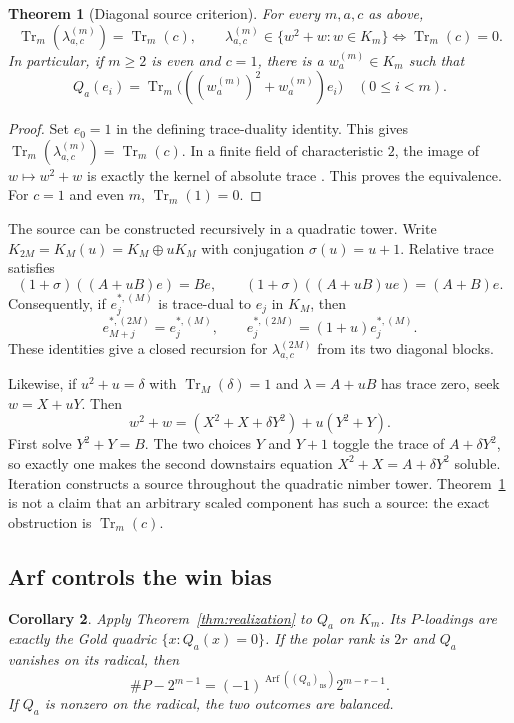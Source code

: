 \documentclass[11pt]{article}
\newtheorem{theorem}{Theorem}[section]
\newtheorem{corollary}[theorem]{Corollary}
\theoremstyle{definition}
\theoremstyle{remark}
\newcommand{\Tr}{\operatorname{Tr}}
\newcommand{\Arf}{\operatorname{Arf}}
\begin{document}
\begin{theorem}[Diagonal source criterion]\label{thm:diagonal}
For every $m,a,c$ as above,
\[
 \Tr_m(\lambda_{a,c}^{(m)})=\Tr_m(c),
 \qquad
 \lambda_{a,c}^{(m)}\in\{w^2+w:w\in K_m\}
 \Longleftrightarrow \Tr_m(c)=0.
\]
In particular, if $m\ge2$ is even and $c=1$, there is a
$w_a^{(m)}\in K_m$ such that
\[
 Q_a(e_i)=
 \Tr_m\bigl(((w_a^{(m)})^2+w_a^{(m)})e_i\bigr)
 \quad(0\le i<m).
\]
\end{theorem}

\begin{proof}
Set $e_0=1$ in the defining trace-duality identity.  This gives
$\Tr_m(\lambda_{a,c}^{(m)})=\Tr_m(c)$.  In a finite field of characteristic
$2$, the image of $w\mapsto w^2+w$ is exactly the kernel of absolute trace
\cite[Theorem 2.25]{lidlniederreiter1997}.  This proves the equivalence.
For $c=1$ and even $m$, $\Tr_m(1)=0$.
\end{proof}

The source can be constructed recursively in a quadratic tower.  Write
$K_{2M}=K_M(u)=K_M\oplus uK_M$ with conjugation $\sigma(u)=u+1$.  Relative
trace satisfies
\[
 (1+\sigma)((A+uB)e)=Be,\qquad
 (1+\sigma)((A+uB)ue)=(A+B)e.
\]
Consequently, if $e_j^{*,(M)}$ is trace-dual to $e_j$ in $K_M$, then
\[
 e_{M+j}^{*,(2M)}=e_j^{*,(M)},\qquad
 e_j^{*,(2M)}=(1+u)e_j^{*,(M)}.
\]
These identities give a closed recursion for $\lambda_{a,c}^{(2M)}$ from its
two diagonal blocks.

Likewise, if $u^2+u=\delta$ with $\Tr_M(\delta)=1$ and
$\lambda=A+uB$ has trace zero, seek $w=X+uY$.  Then
\[
 w^2+w=(X^2+X+\delta Y^2)+u(Y^2+Y).
\]
First solve $Y^2+Y=B$.  The two choices $Y$ and $Y+1$ toggle the trace of
$A+\delta Y^2$, so exactly one makes the second downstairs equation
$X^2+X=A+\delta Y^2$ soluble.  Iteration constructs a source throughout the
quadratic nimber tower.  Theorem~\ref{thm:diagonal} is not a claim that an
arbitrary scaled component has such a source: the exact obstruction is
$\Tr_m(c)$.

\subsection{Arf controls the win bias}

\begin{corollary}\label{cor:arf-bias}
Apply Theorem~\ref{thm:realization} to $Q_a$ on $K_m$.  Its $P$-loadings are
exactly the Gold quadric $\{x:Q_a(x)=0\}$.  If the polar rank is $2r$ and
$Q_a$ vanishes on its radical, then
\[
 \#P-2^{m-1}
 =(-1)^{\Arf((Q_a)_{\mathrm{ns}})}2^{m-r-1}.
\]
If $Q_a$ is nonzero on the radical, the two outcomes are balanced.
\end{corollary}
\end{document}

